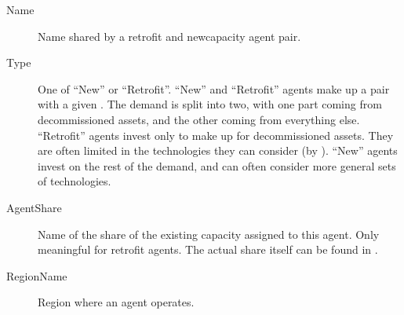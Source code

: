 \documentclass[letterpaper,10pt,english]{sphinxmanual}
\begin{document}
\label{\detokenize{inputs/agents:name}}\begin{description}
\item[{Name}] \leavevmode
Name shared by a retrofit and new\sphinxhyphen{}capacity agent pair.

\item[{Type}] \leavevmode
One of “New” or “Retrofit”. “New” and “Retrofit” agents make up a pair with a given
{\hyperref[\detokenize{inputs/agents:name}]{}}. The demand is split into two, with one part coming from
decommissioned assets, and the other coming from everything else. “Retrofit” agents
invest only to make up for decommissioned assets. They are often limited in the
technologies they can consider (by {\hyperref[\detokenize{inputs/agents:searchrule}]{}}). “New” agents
invest on the rest of the demand, and can often consider more general sets of
technologies.

\item[{AgentShare}] \leavevmode
Name of the share of the existing capacity assigned to this agent. Only meaningful
for retrofit agents. The actual share itself can be found in
{\hyperref[\detokenize{inputs/technodata:inputs-technodata}]{}}.

\item[{RegionName}] \leavevmode
Region where an agent operates.

\end{description}
\end{document}
